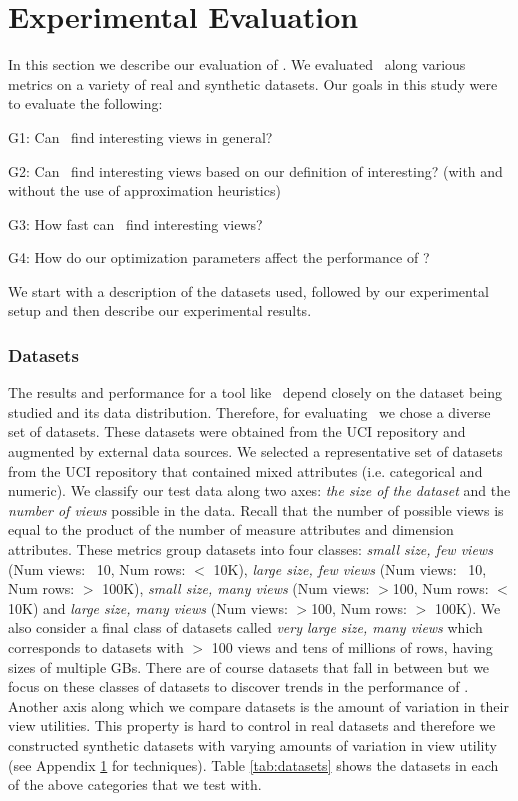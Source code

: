 
\section{Experimental Evaluation}

In this section we describe our evaluation of \SeeDB.
We evaluated \SeeDB\ along various metrics on a variety of real and synthetic
datasets.
Our goals in this study were to evaluate the following: 
\squishlist
\item G1: Can \SeeDB\ find interesting views in general?
\item G2: Can \SeeDB\ find interesting views based on our definition of
interesting? (with and without the use of approximation heuristics)
\item G3: How fast can \SeeDB\ find interesting views?
\item G4: How do our optimization parameters affect the performance of
\SeeDB?
\squishend

We start with a description of the datasets used, followed by our experimental
setup and then describe our experimental results.

\subsubsection*{Datasets}
The results and performance
for a tool like \SeeDB\ depend closely on the dataset being studied and its
data distribution.
Therefore, for evaluating \SeeDB\ we chose a diverse set of datasets.
These datasets were obtained from the UCI repository and augmented by
external data sources. 
We selected a representative set of datasets from the UCI repository that
contained mixed attributes (i.e. categorical and numeric).
We classify our test data along two axes: {\it the size of the dataset} and the
{\it number of views} possible in the data. 
Recall that the number of possible views is equal to the product of the number
of measure attributes and dimension attributes.
These metrics group datasets into four classes: {\it small size, few views}
(Num views: ~10, Num rows: $<$ 10K), {\it large size, few
views} (Num views: ~10, Num rows: $>$ 100K), {\it small size, many views}
(Num views: $>$100, Num rows: $<$ 10K) and {\it large size, many views} (Num
views: $>$100, Num rows: $>$ 100K).
We also consider a final class of datasets called {\it very large size, many
views} which corresponds to datasets with $>$ 100 views and tens of millions of
rows, having sizes of multiple GBs.
There are of course datasets that fall in between but we focus on
these classes of datasets to discover trends in the performance of \SeeDB.
Another axis along which we compare datasets is the amount of variation in
their view utilities.
This property is hard to control in real datasets and therefore we constructed
synthetic datasets with varying amounts of variation in view utility (see
Appendix \ref{} for techniques).
Table \ref{tab:datasets} shows the datasets in each of the
above categories that we test with.

